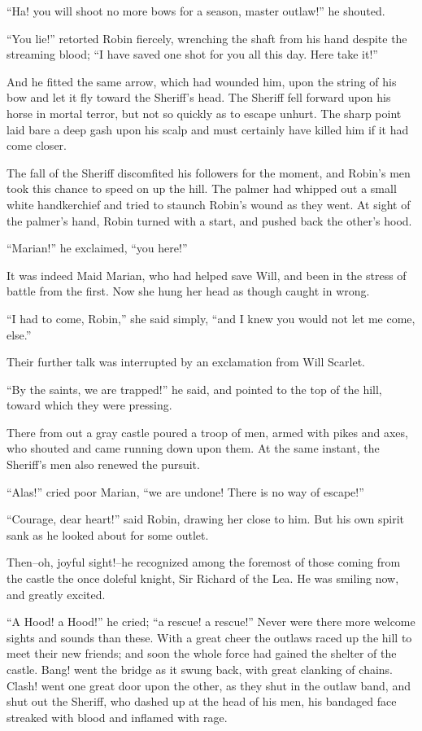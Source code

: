``Ha! you will shoot no more bows for a season, master outlaw!'' he
shouted.

``You lie!'' retorted Robin fiercely, wrenching the shaft from his hand
despite the streaming blood; ``I have saved one shot for you all this
day. Here take it!''

And he fitted the same arrow, which had wounded him, upon the string of
his bow and let it fly toward the Sheriff's head. The Sheriff fell
forward upon his horse in mortal terror, but not so quickly as to escape
unhurt. The sharp point laid bare a deep gash upon his scalp and must
certainly have killed him if it had come closer.

The fall of the Sheriff discomfited his followers for the moment, and
Robin's men took this chance to speed on up the hill. The palmer had
whipped out a small white handkerchief and tried to staunch Robin's
wound as they went. At sight of the palmer's hand, Robin turned with a
start, and pushed back the other's hood.

``Marian!'' he exclaimed, ``you here!''

It was indeed Maid Marian, who had helped save Will, and been in the
stress of battle from the first. Now she hung her head as though caught
in wrong.

``I had to come, Robin,'' she said simply, ``and I knew you would not
let me come, else.''

Their further talk was interrupted by an exclamation from Will Scarlet.

``By the saints, we are trapped!'' he said, and pointed to the top of
the hill, toward which they were pressing.

There from out a gray castle poured a troop of men, armed with pikes and
axes, who shouted and came running down upon them. At the same instant,
the Sheriff's men also renewed the pursuit.

``Alas!'' cried poor Marian, ``we are undone! There is no way of
escape!''

``Courage, dear heart!'' said Robin, drawing her close to him. But his
own spirit sank as he looked about for some outlet.

Then--oh, joyful sight!--he recognized among the foremost of those
coming from the castle the once doleful knight, Sir Richard of the Lea.
He was smiling now, and greatly excited.

``A Hood! a Hood!'' he cried; ``a rescue! a rescue!'' Never were there
more welcome sights and sounds than these. With a great cheer the
outlaws raced up the hill to meet their new friends; and soon the whole
force had gained the shelter of the castle. Bang! went the bridge as it
swung back, with great clanking of chains. Clash! went one great door
upon the other, as they shut in the outlaw band, and shut out the
Sheriff, who dashed up at the head of his men, his bandaged face
streaked with blood and inflamed with rage.
